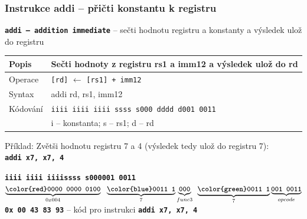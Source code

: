 \documentclass{beamer}
\begin{document}
\begin{frame}
\frametitle{Instrukce addi -- přičti konstantu k registru}

\textbf{\texttt{addi -- addition immediate}} -- sečti hodnotu registru a konstanty a výsledek ulož do registru

\bigskip

\begin{tabular}{|l|l|}\hline
Popis & Sečti hodnoty z registru rs1 a imm12 a výsledek ulož do rd \\ \hline
Operace & \texttt{[rd]} $\leftarrow$ \texttt{[rs1] + imm12} \\ \hline
Syntax & addi rd, rs1, imm12 \\ \hline
Kódování & \texttt{iiii iiii iiii ssss s000 dddd d001 0011} \\ 
 & i -- konstanta; s -- rs1; d -- rd \\ \hline
\end{tabular}

\bigskip

Příklad: Zvětši hodnotu registru 7 a 4 (výsledek tedy ulož do registru 7):\\
\textbf{\texttt{addi x7, x7, 4}}

\textbf{\texttt{\color{red}iiii iiii iiii}}\phantom{xx}\textbf{\texttt{\color{blue}ssss s}}\hspace{0.1cm}\textbf{\texttt{000\hspace{0.05cm}001 0011}}\\
$\underbrace{\textbf{\texttt{\color{red}0000 0000 0100}}}_{0x004}\texttt{ }\underbrace{\textbf{\texttt{\color{blue}0011 1}}}_{7}\underbrace{\textbf{\texttt{000}}}_{func3}\phantom{i}\underbrace{\textbf{\texttt{\color{green}0011 1}}}_{7}\underbrace{\textbf{\texttt{001 0011}}}_{opcode}$\\

\textbf{\texttt{0x 00 43 83 93}} -- kód pro instrukci \textbf{\texttt{addi x7, x7, 4}}


\end{frame}
\end{document}
